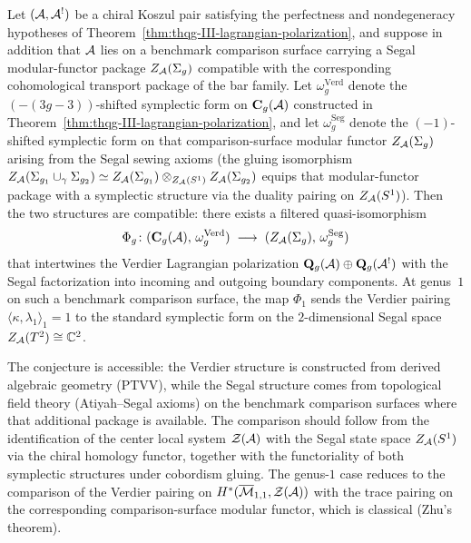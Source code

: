 \begin{conjecture}
\ClaimStatusConjectured
Let $(\mathcal{A}, \mathcal{A}^!)$ be a chiral Koszul pair satisfying the
perfectness and nondegeneracy hypotheses of
Theorem~\textup{\ref{thm:thqg-III-lagrangian-polarization}}, and
suppose in addition that $\mathcal{A}$ lies on a benchmark comparison
surface carrying a Segal modular-functor package
$Z_{\mathcal{A}}(\Sigma_g)$ compatible with the corresponding
cohomological transport package of the bar family.
Let $\omega_g^{\mathrm{Verd}}$ denote the $(-(3g{-}3))$-shifted
symplectic form on $\mathbf{C}_g(\mathcal{A})$ constructed in
Theorem~\textup{\ref{thm:thqg-III-lagrangian-polarization}},
and let $\omega_g^{\mathrm{Seg}}$ denote the $(-1)$-shifted
symplectic form on that comparison-surface modular functor
$Z_{\mathcal{A}}(\Sigma_g)$
arising from the Segal sewing axioms
\textup{(}the gluing isomorphism
$Z_{\mathcal{A}}(\Sigma_{g_1} \cup_\gamma \Sigma_{g_2})
\simeq Z_{\mathcal{A}}(\Sigma_{g_1}) \otimes_{Z_{\mathcal{A}}(S^1)} Z_{\mathcal{A}}(\Sigma_{g_2})$
equips that modular-functor package with a symplectic structure via the
duality pairing on $Z_{\mathcal{A}}(S^1)$\textup{)}.
Then the two structures are compatible: there exists a
filtered quasi-isomorphism
\[
\Phi_g \colon
(\mathbf{C}_g(\mathcal{A}),\, \omega_g^{\mathrm{Verd}})
\;\longrightarrow\;
(Z_{\mathcal{A}}(\Sigma_g),\, \omega_g^{\mathrm{Seg}})
\]
that intertwines the Verdier Lagrangian polarization
$\mathbf{Q}_g(\mathcal{A}) \oplus \mathbf{Q}_g(\mathcal{A}^!)$ with the
Segal factorization into incoming and outgoing boundary
components. At genus~$1$ on such a benchmark comparison
surface, the map $\Phi_1$ sends the
Verdier pairing $\langle \kappa, \lambda_1 \rangle_1 = 1$
to the standard symplectic form on the $2$-dimensional
Segal space $Z_{\mathcal{A}}(T^2) \cong \mathbb{C}^2$.
\end{conjecture}

\begin{remark}
The conjecture is accessible: the Verdier structure is
constructed from derived algebraic geometry (PTVV), while the
Segal structure comes from topological field theory (Atiyah--Segal
axioms) on the benchmark comparison surfaces where that
additional package is available. The comparison should follow
from the identification
of the center local system $\mathcal{Z}(\mathcal{A})$ with the Segal
state space $Z_{\mathcal{A}}(S^1)$ via the chiral homology functor, together
with the functoriality of both symplectic structures under
cobordism gluing. The genus-$1$ case reduces to the comparison
of the Verdier pairing on $H^*(\overline{\mathcal{M}}_{1,1},
\mathcal{Z}(\mathcal{A}))$ with the trace pairing on the corresponding
comparison-surface modular functor, which is classical
(Zhu's theorem).
\end{remark}

